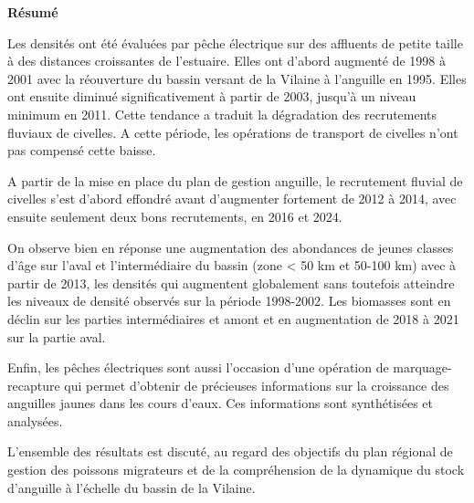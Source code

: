 \documentclass[10pt,twocolumn,titlepage,twoside]{article}\usepackage[]{graphicx}\usepackage[]{xcolor}
\begin{document}
\onecolumn
\thispagestyle{empty}
\pagecolor{bleu_EV}
\begin{tcolorbox}[enhanced jigsaw,
                  colback=turquoise_EV!30,%
                  colframe=turquoise_EV,%
                  width=\textwidth,%
                  arc=3mm, auto outer arc,
                  boxrule=5pt,
                  drop shadow={bleu_EV!50!gray!80}
                 ]
\textbf{Résumé}\par

 \vspace{8mm}
 
 
    Les densités ont été évaluées par pêche électrique  sur des
    affluents de petite taille à des distances croissantes de l'estuaire.     
    Elles ont d'abord augmenté de 1998 à 2001 avec la réouverture du
    bassin versant de la Vilaine à l'anguille en 1995. Elles ont ensuite diminué
    significativement à partir de 2003, jusqu'à un niveau minimum en 2011. Cette tendance a traduit la dégradation des
    recrutements fluviaux de civelles. A cette période, les opérations de
    transport de civelles n'ont pas compensé cette baisse.  
    
    A partir de la mise en place du plan de gestion anguille,  le recrutement
    fluvial de civelles s'est d'abord effondré avant d'augmenter fortement de
    2012 à 2014, avec ensuite seulement deux bons recrutements, en 2016 et 2024.
    
    On observe bien en réponse une augmentation des abondances de jeunes
    classes d'âge sur l'aval et l'intermédiaire du bassin (zone < 50 km et
    50-100 km) avec à partir de 2013, les densités qui augmentent globalement
    sans toutefois atteindre les niveaux de densité
    observés sur la période 1998-2002. Les biomasses sont en déclin sur les
    parties intermédiaires et amont et en augmentation 
    de 2018 à 2021 sur la partie aval.
    
    Enfin, les pêches électriques sont aussi l'occasion d'une opération de
    marquage-recapture qui permet d'obtenir de précieuses informations sur la
    croissance des anguilles jaunes dans les cours d'eaux. Ces informations sont
    synthétisées et analysées.
    
    L'ensemble des résultats est discuté, au regard des objectifs du plan
    régional de gestion des poissons migrateurs et de la compréhension de la
    dynamique du stock d'anguille à l'échelle du bassin de la Vilaine.\\
        

\end{tcolorbox}
\end{document}
